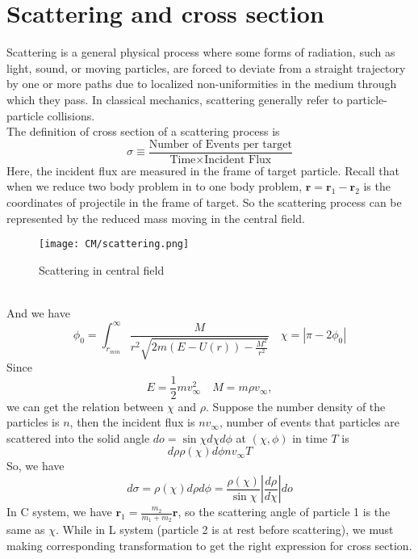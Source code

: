 \section{Scattering and cross section}
Scattering is a general physical process where some forms of radiation, such as light, sound, or moving particles, are forced to deviate from a straight trajectory by one or more paths due to localized non-uniformities in the medium through which they pass.  In classical mechanics, scattering generally refer to particle-particle collisions. \\
The definition of cross section  of a scattering process is
\[\sigma \equiv \frac{\mbox{Number of Events per target}}{\mbox{Time} \times \mbox{Incident Flux}}\]
Here, the incident flux are measured in the frame of target particle. Recall that when we reduce two body problem in to one body problem, $\bm{r} = \bm{r}_1 - \bm{r}_2$ is the coordinates of projectile in the frame of target. So the scattering process can be represented by the reduced mass moving in the central field. 
\begin{figure}[!h]
	\centering
	\texttt{[image: CM/scattering.png]}
	\caption{Scattering in central field}
\end{figure}\\
And we have
\[\phi_0 = \int_{r_{min}}^{\infty} \frac{M}{r^2 \sqrt{2m(E-U(r))-\frac{M^2}{r^2}}} \quad \chi = |\pi - 2\phi_0|\]
Since
\[E = \frac{1}{2}m v_{\infty}^2 \quad M = m\rho v_{\infty},\]
we can get the relation between  $\chi$ and $\rho$. Suppose the number density of the particles is $n$, then the incident flux is $nv_{\infty}$, number of events that particles are scattered into the solid angle $do = \sin\chi d\chi d\phi$ at $(\chi,\phi)$ in time $T$ is
\[d\rho \rho(\chi) d\phi nv_{\infty} T \]
So, we have
\[d\sigma = \rho(\chi) d\rho d\phi = \frac{\rho(\chi)}{\sin\chi} \left| \frac{d\rho}{d\chi} \right| do\]
In C system, we have $\bm{r}_1 = \frac{m_2}{m_1+m_2} \bm{r}$, so the scattering angle of particle 1 is the same as $\chi$. While in L system (particle 2 is at rest before scattering), we must making corresponding transformation to get the right expression for cross section.

